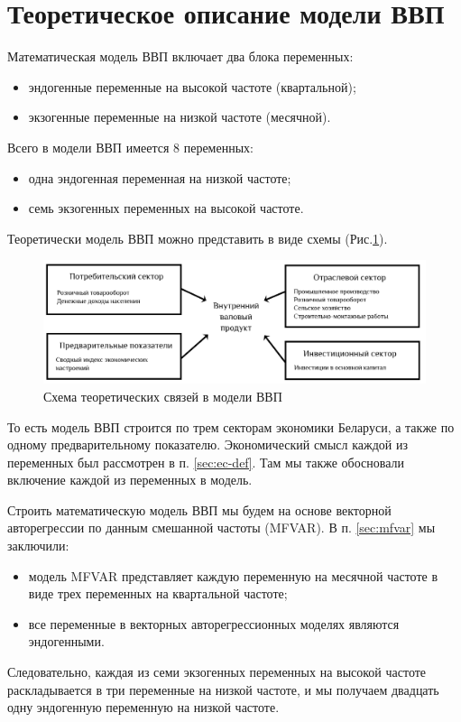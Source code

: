 \documentclass[a4paper, 14pt]{extreport}
\numberwithin{equation}{section}
\numberwithin{equation}{section}
\begin{document}
	\section{Теоретическое описание модели ВВП}
	
	Математическая модель ВВП включает два блока переменных:
	\begin{itemize}
		\item эндогенные переменные на высокой частоте (квартальной);
		\item экзогенные переменные на низкой частоте (месячной).
	\end{itemize}
	
	Всего в модели ВВП имеется $8$ переменных:
	\begin{itemize}
		\item одна эндогенная переменная на низкой частоте;
		\item семь экзогенных переменных на высокой частоте.
	\end{itemize}
	Теоретически модель ВВП можно представить в виде схемы (Рис.\ref{fig:image41}).
	\begin{figure}[h!]
		\centering
		\includegraphics[scale=0.35]{images/image41}
		\caption{Схема теоретических связей в модели ВВП}
		\label{fig:image41}
	\end{figure}
	То есть модель ВВП строится по трем секторам экономики Беларуси, а также по одному предварительному показателю. Экономический смысл каждой из переменных был рассмотрен в п. \ref{sec:ec-def}. Там мы также обосновали включение каждой из переменных в модель.
	
	Строить математическую модель ВВП мы будем на основе векторной авторегрессии по данным смешанной частоты (MFVAR). 
	В п. \ref{sec:mfvar} мы заключили:
	\begin{itemize}
		\item  модель MFVAR представляет каждую переменную на месячной частоте в виде трех переменных на квартальной частоте;
		\item все переменные в векторных авторегрессионных моделях являются эндогенными.
	\end{itemize}
	Следовательно, каждая из семи экзогенных переменных на высокой частоте раскладывается в три переменные на низкой частоте, и мы получаем двадцать одну эндогенную переменную на низкой частоте.
	
\end{document}
